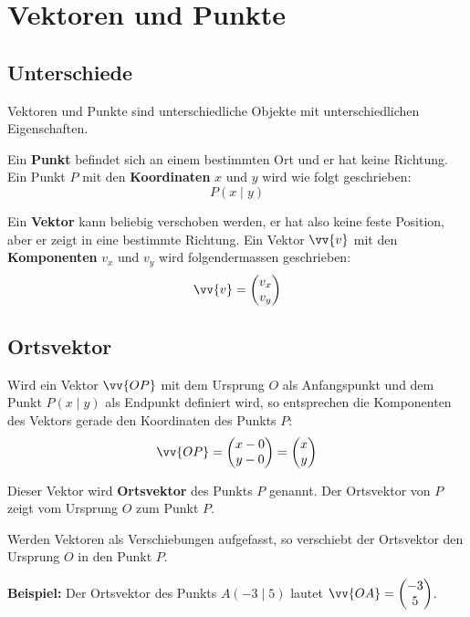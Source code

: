 \newpage
\section{Vektoren und Punkte}

\subsection{Unterschiede}
Vektoren und Punkte sind unterschiedliche Objekte mit unterschiedlichen Eigenschaften.

Ein \textbf{Punkt} befindet sich an einem bestimmten Ort und er hat keine Richtung. Ein Punkt $P$ mit den \textbf{Koordinaten} $x$ und $y$ wird wie folgt geschrieben:
\[
  P(x\mid y)
\]

Ein \textbf{Vektor} kann beliebig verschoben werden, er hat also keine feste Position, aber er zeigt in eine bestimmte Richtung. Ein Vektor $\vv{v}$ mit den \textbf{Komponenten} $v_{x}$ und $v_{y}$ wird folgendermassen geschrieben:
\[
  \vv{v} = \vxy{v_{x}}{v_{y}}
\]

\subsection{Ortsvektor}

Wird ein Vektor $\vv{OP}$ mit dem Ursprung $O$ als Anfangspunkt und dem Punkt $P(x\mid y)$ als Endpunkt definiert wird, so entsprechen die Komponenten des Vektors gerade den Koordinaten des Punkts $P$:
\[
  \vv{OP} = \vxy{x-0}{y-0} = \vxy{x}{y}
\]
\begin{center}
\end{center}

Dieser Vektor wird \textbf{Ortsvektor} des Punkts $P$ genannt. Der Ortsvektor von $P$ zeigt vom Ursprung $O$ zum Punkt $P$.

Werden Vektoren als Verschiebungen aufgefasst, so verschiebt der Ortsvektor den Ursprung $O$ in den Punkt $P$.
\begin{example}
  \textbf{Beispiel:} Der Ortsvektor des Punkts $A(-3\mid 5)$ lautet $\vv{OA} = \vxy{-3}{5}$.
\end{example}

